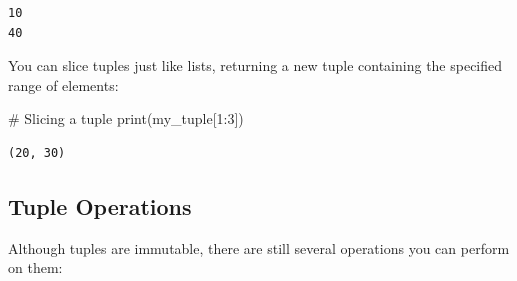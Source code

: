 \documentclass[
  letterpaper,
  DIV=11,
  numbers=noendperiod]{scrreprt}
\newenvironment{Shaded}{\begin{snugshade}}{\end{snugshade}}
\newcommand{\BuiltInTok}[1]{\textcolor[rgb]{0.00,0.23,0.31}{#1}}
\newcommand{\CommentTok}[1]{\textcolor[rgb]{0.37,0.37,0.37}{#1}}
\newcommand{\DecValTok}[1]{\textcolor[rgb]{0.68,0.00,0.00}{#1}}
\newcommand{\NormalTok}[1]{\textcolor[rgb]{0.00,0.23,0.31}{#1}}
\begin{document}
\begin{verbatim}
10
40
\end{verbatim}

You can slice tuples just like lists, returning a new tuple containing
the specified range of elements:

\begin{Shaded}
\begin{Highlighting}[]
\CommentTok{\# Slicing a tuple}
\BuiltInTok{print}\NormalTok{(my\_tuple[}\DecValTok{1}\NormalTok{:}\DecValTok{3}\NormalTok{]) }
\end{Highlighting}
\end{Shaded}

\begin{verbatim}
(20, 30)
\end{verbatim}

\hypertarget{tuple-operations}{%
\subsection{Tuple Operations}\label{tuple-operations}}

Although tuples are immutable, there are still several operations you
can perform on them:
\end{document}
